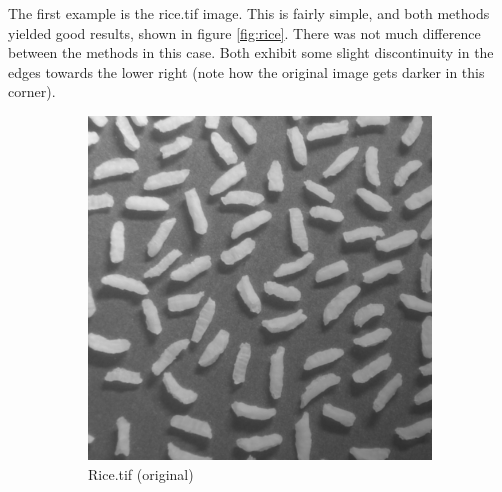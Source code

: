 \documentclass[a4paper]{article}
\begin{document}
The first example is the rice.tif image. This is fairly simple, and both methods yielded good results, shown in figure \ref{fig:rice}. There was not much difference between the methods in this case. Both exhibit some slight discontinuity in the edges towards the lower right (note how the original image gets darker in this corner).
\begin{figure}
    
        \centering
        \begin{subfigure}[b]{0.3\textwidth}
                \centering
                \includegraphics[width=\textwidth]{q1-rice-orig.png}
                \caption{Rice.tif (original)}
                \label{fig:8a}
        \end{subfigure}
        \begin{subfigure}[b]{0.3\textwidth}
                \centering

\end{subfigure}
\end{figure}
\end{document}

